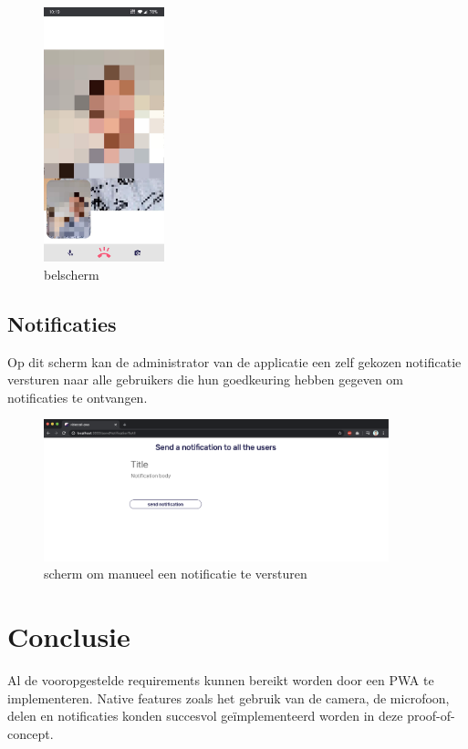 	
		\begin{figure}[H]
			\centering
			\includegraphics[width=35mm]{./img/POC/call.jpg}{}		
			\caption{belscherm}
		\end{figure}
		
	\subsection{Notificaties}
		Op dit scherm kan de administrator van de applicatie een zelf gekozen notificatie versturen naar alle gebruikers die hun goedkeuring hebben gegeven om notificaties te ontvangen.
		
		\begin{figure}[H]
			\centering
			\includegraphics[width=100mm]{./img/POC/sendNoti}{}		
			\caption{scherm om manueel een notificatie te versturen}
		\end{figure}
		
\newpage
\section{Conclusie}
	
	Al de vooropgestelde requirements kunnen bereikt worden door een PWA te implementeren. 
	Native features zoals het gebruik van de camera, de microfoon, delen en notificaties konden succesvol geïmplementeerd worden in deze proof-of-concept.
	
